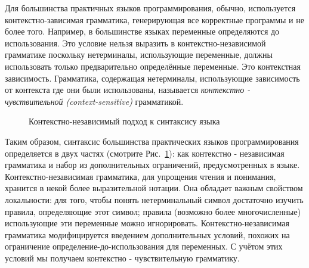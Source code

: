 Для большинства практичных языков программирования, обычно, используется контекстно-зависимая грамматика, генерирующая все корректные программы и не более того. Например, в большинстве языках переменные определяются до использования. Это условие нельзя выразить в контекстно-независимой грамматике поскольку нетерминалы, использующие переменные, должны использовать только предварительно определённые переменные. Это контекстная зависимость. Грамматика, содержащая нетерминалы, использующие зависимость от контекста где они были использованы, называется \emph{контекстно - чувствительной (context-sensitive)} грамматикой.

\begin{figure}
\caption{Контекстно-независимый подход к синтаксису языка}
\label{figure:context-free_approach}
\end{figure}


Таким образом, синтаксис большинства практических языков программирования определяется в двух частях (смотрите Рис.~\ref{figure:context-free_approach}): как контекстно - независимая грамматика и набор из дополнительных ограничений, предусмотренных в языке. Контекстно-независимая грамматика, для упрощения чтения и понимания, хранится в некой более выразительной нотации. Она обладает важным свойством локальности: для того, чтобы понять нетерминальный символ достаточно изучить правила, определяющие этот символ; правила (возможно более многочисленные) использующие эти переменные можно игнорировать. Контекстно-независимая грамматика модифицируется введением дополнительных условий, похожих на ограничение определение-до-использования для переменных. С учётом этих условий мы получаем контекстно - чувствительную грамматику.

